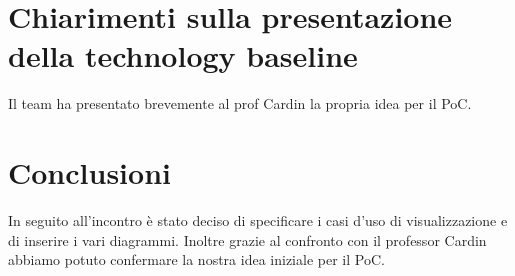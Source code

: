 \section{Chiarimenti sulla presentazione della technology baseline}
Il team ha presentato brevemente al prof Cardin la propria idea per il PoC.

\section{Conclusioni}
In seguito all'incontro è stato deciso di specificare i casi d'uso di visualizzazione e di inserire i vari diagrammi. Inoltre grazie al confronto con il professor Cardin abbiamo potuto confermare la nostra idea iniziale per il PoC.
